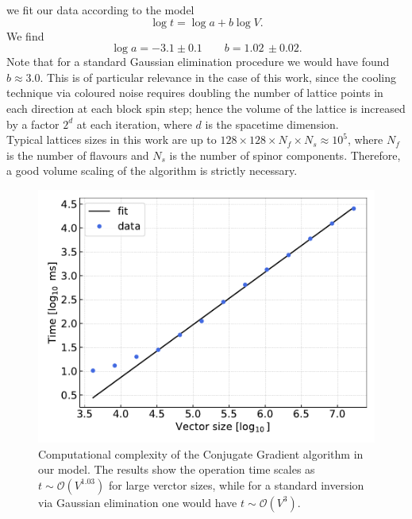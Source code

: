 we fit our data according to the model 
\begin{equation*}
    \log t = \log a + b \log V.
\end{equation*}
We find 
\begin{equation*}
    \log a = -3.1 \pm 0.1 \qquad b = 1.02 \, \pm 0.02.
\end{equation*}
Note that for a standard Gaussian elimination procedure we would have found $b \approx 3.0$. This is of particular relevance in the case of this work, since the cooling technique via coloured noise requires doubling the number of lattice points in each direction at each block spin step; hence the volume of the lattice is increased by a factor $2^d$ at each iteration, where $d$ is the spacetime dimension. \\
Typical lattices sizes in this work are up to $128 \times 128 \times N_f \times N_s \approx 10^5$, where $N_f$ is the number of flavours and $N_s$ is the number of spinor components. Therefore, a good volume scaling of the algorithm is strictly necessary.
\begin{figure}[t]
    \centering
    \includegraphics[scale=0.65]{figures/complexity.pdf}
    \caption[Computational complexity of the Conjugate Gradient algorithm.]{Computational complexity of the Conjugate Gradient algorithm in our model. The results show the operation time scales as $t \sim \mathcal{O}(V^{1.03})$ for large verctor sizes, while for a standard inversion via Gaussian elimination one would have $t \sim \mathcal{O}(V^3)$.}
    \label{fig:complexity}
\end{figure}


